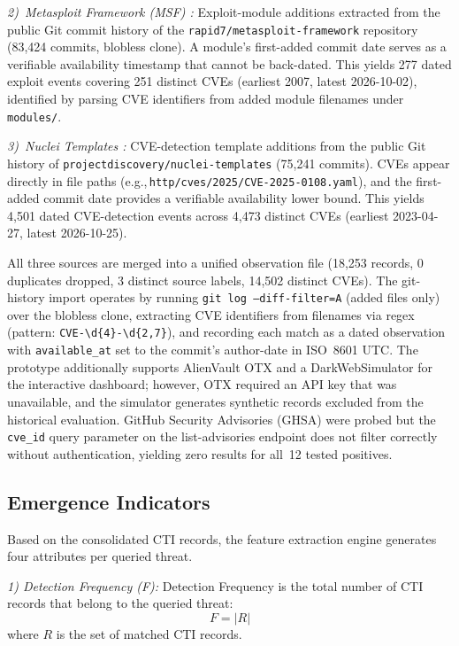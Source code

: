 \documentclass[conference]{IEEEtran}
\begin{document}
\textit{2)~Metasploit Framework (MSF) \cite{metasploit}:} Exploit-module additions extracted from the public Git commit history of the \texttt{rapid7/metasploit-framework} repository (83{,}424 commits, blobless clone). A module's first-added commit date serves as a verifiable availability timestamp that cannot be back-dated. This yields 277 dated exploit events covering 251 distinct CVEs (earliest 2007, latest 2026-10-02), identified by parsing CVE identifiers from added module filenames under \texttt{modules/}.

\textit{3)~Nuclei Templates \cite{nuclei}:} CVE-detection template additions from the public Git history of \texttt{projectdiscovery/nuclei-templates} (75{,}241 commits). CVEs appear directly in file paths (e.g.,\,\texttt{http/cves/2025/CVE-2025-0108.yaml}), and the first-added commit date provides a verifiable availability lower bound. This yields 4{,}501 dated CVE-detection events across 4{,}473 distinct CVEs (earliest 2023-04-27, latest 2026-10-25).

All three sources are merged into a unified observation file (18{,}253 records, 0 duplicates dropped, 3 distinct source labels, 14{,}502 distinct CVEs). The git-history import operates by running \texttt{git log --diff-filter=A} (added files only) over the blobless clone, extracting CVE identifiers from filenames via regex (pattern: \texttt{CVE-\textbackslash d\{4\}-\textbackslash d\{2,7\}}), and recording each match as a dated observation with \texttt{available\_at} set to the commit's author-date in ISO~8601 UTC. The prototype additionally supports AlienVault OTX and a DarkWebSimulator for the interactive dashboard; however, OTX required an API key that was unavailable, and the simulator generates synthetic records excluded from the historical evaluation. GitHub Security Advisories (GHSA) were probed but the \texttt{cve\_id} query parameter on the list-advisories endpoint does not filter correctly without authentication, yielding zero results for all~12 tested positives.

\subsection{Emergence Indicators}

Based on the consolidated CTI records, the feature extraction engine generates four attributes per queried threat.

\textit{1) Detection Frequency (F):} Detection Frequency is the total number of CTI records that belong to the queried threat:
\begin{equation}
F = |R|
\tag{1}
\end{equation}
where $R$ is the set of matched CTI records.
\end{document}
